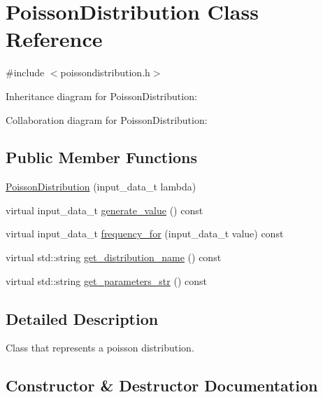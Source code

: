 \hypertarget{classPoissonDistribution}{}\section{Poisson\+Distribution Class Reference}
\label{classPoissonDistribution}


{\ttfamily \#include $<$poissondistribution.\+h$>$}



Inheritance diagram for Poisson\+Distribution\+:


Collaboration diagram for Poisson\+Distribution\+:
\subsection*{Public Member Functions}
\begin{DoxyCompactItemize}
\item 
\hyperlink{classPoissonDistribution_a8cbe17ce7593689a1e5123647801536a}{Poisson\+Distribution} (input\+\_\+data\+\_\+t lambda)
\item 
virtual input\+\_\+data\+\_\+t \hyperlink{classPoissonDistribution_a8d8c1d669615f2259af239df01550f7d}{generate\+\_\+value} () const
\item 
virtual input\+\_\+data\+\_\+t \hyperlink{classPoissonDistribution_ae3eb709210bb2dcae5f41c6fdccede44}{frequency\+\_\+for} (input\+\_\+data\+\_\+t value) const
\item 
virtual std\+::string \hyperlink{classPoissonDistribution_a2c6ac9d330241badbdeadc065ad47c1e}{get\+\_\+distribution\+\_\+name} () const
\item 
virtual std\+::string \hyperlink{classPoissonDistribution_a48e471c3bcae5b197a576f61777e67f3}{get\+\_\+parameters\+\_\+str} () const
\end{DoxyCompactItemize}


\subsection{Detailed Description}
Class that represents a poisson distribution. 

\subsection{Constructor \& Destructor Documentation}
\mbox{\label{classPoissonDistribution_a8cbe17ce7593689a1e5123647801536a}} 
